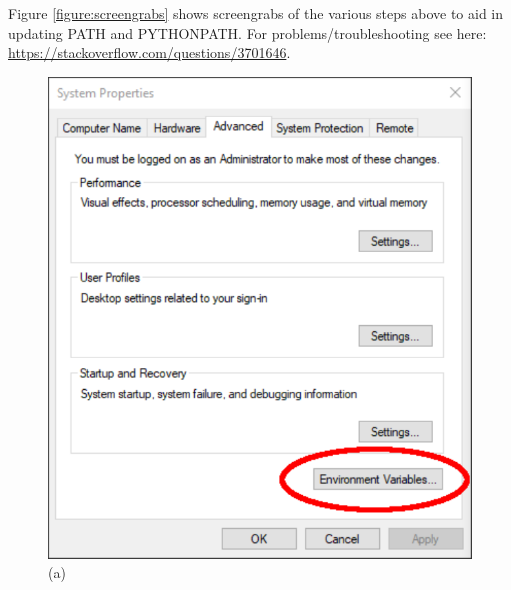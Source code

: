 \noindent Figure \ref{figure:screengrabs} shows screengrabs of the various steps above to aid in updating PATH and PYTHONPATH.
\vspace{0.25cm}
\noindent For problems/troubleshooting see here: \url{https://stackoverflow.com/questions/3701646}.

\begin{figure}
\begin{center}
\begin{minipage}[t]{.29\textwidth}
\begin{center}
\includegraphics[width=\textwidth]{Figures/win/Win1.pdf}
(a)
\end{center}
\end{minipage}
\begin{minipage}[t]{.29\textwidth}
\begin{center}

\end{center}
\end{minipage}
\end{center}
\end{figure}
